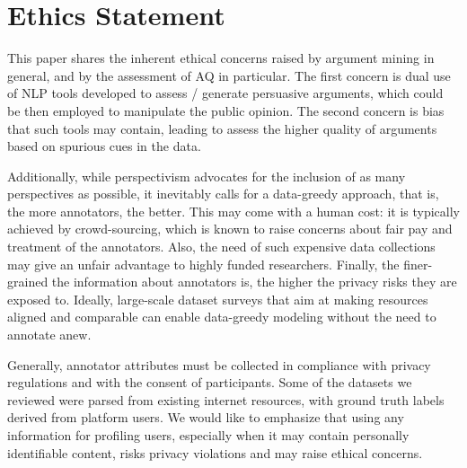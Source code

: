 \section*{Ethics Statement}

This paper shares the inherent ethical concerns raised by argument mining in general, and by the assessment of AQ in particular. The first concern is dual use of NLP tools developed to assess / generate persuasive arguments, which could be then employed to manipulate the public opinion. The second concern is bias that such tools may contain, leading to assess the higher quality of arguments based on spurious cues in the data.

Additionally, while perspectivism advocates for the inclusion of as many perspectives as possible, it inevitably calls for a data-greedy approach, that is, the more annotators, the better. This may come with a human cost:  it is typically achieved by crowd-sourcing, which is known to raise concerns about fair pay and treatment of the annotators. Also, the need of such expensive data collections may give an unfair advantage to highly funded researchers. Finally, the finer-grained the information about annotators is, the higher the privacy risks they are exposed to. Ideally, large-scale dataset surveys that aim at making resources aligned and comparable can enable data-greedy modeling without the need to annotate anew. 

Generally, annotator attributes must be collected in compliance with privacy regulations and with the consent of participants. Some of the datasets we reviewed were parsed from existing internet resources, with ground truth labels derived from platform users. We would like to emphasize that using any information for profiling users, especially when it may contain personally identifiable content, risks privacy violations and may raise ethical concerns.